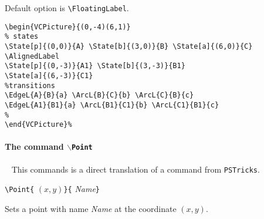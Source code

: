 \documentclass[11pt,twoside]{article}
\newlength{\ColoText}%
\newlength{\ColoFigu}%
\newlength{\parindenttemp} %
\newcommand{\noi}{\noindent}
\newlength{\jsIndent}%
\newlength{\ColSource}%
\newlength{\ColFigur}%
\newcommand{\PSTricks}{\texttt{PSTricks}\xspace}
\begin{document}
\noi
Default option is \verb+\FloatingLabel+.

\noi 
\hspace*{-\jsIndent}
\begin{minipage}[c]{\ColFigur}%
\par\vspace*{0mm}%
\bigskip 
\begin{center}
%
\end{center}
\end{minipage}%
\hspace*{1.2em}%
\begin{minipage}[c]{\ColSource}
\setlength{\parindent}{\parindenttemp}%
\par\vspace*{0mm}%
\footnotesize
\begin{verbatim}
\begin{VCPicture}{(0,-4)(6,1)}
% states
\State[p]{(0,0)}{A} \State[b]{(3,0)}{B} \State[a]{(6,0)}{C}
\AlignedLabel
\State[p]{(0,-3)}{A1} \State[b]{(3,-3)}{B1}
\State[a]{(6,-3)}{C1}
%transitions 
\EdgeL{A}{B}{a} \ArcL{B}{C}{b} \ArcL{C}{B}{c} 
\EdgeL{A1}{B1}{a} \ArcL{B1}{C1}{b} \ArcL{C1}{B1}{c} 
%
\end{VCPicture}%
\end{verbatim}
\normalsize
\end{minipage}%



\paragraph{The command \texttt{$\backslash$Point}}
~
This commands is a direct translation of a command from \PSTricks.

\noi 
\hspace*{-\jsIndent}
\begin{minipage}[t]{\ColoText}
        \par\vspace*{0mm}%
        \footnotesize
\verb+\Point{+%
   $(x,y)$\verb+}{+%
   \textsl{Name}\verb+}+
   
\end{minipage}%
\hspace*{1.2em}%
\begin{minipage}[t]{\ColoFigu}%
\par\vspace*{0mm}%
Sets a point with name \textsl{Name} at the coordinate $(x,y)$.
\end{minipage}%
\end{document}
